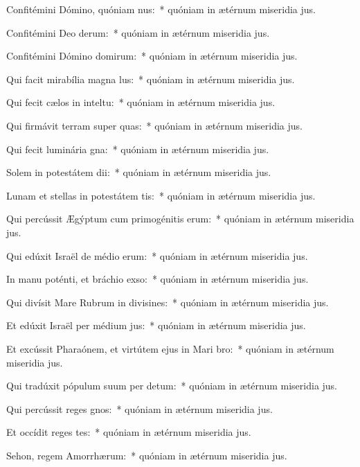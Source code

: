 \item Confitémini Dómino, quóniam nus:~* quóniam in ætérnum miseridia jus.
\item Confitémini Deo derum:~* quóniam in ætérnum miseridia jus.
\item Confitémini Dómino domirum:~* quóniam in ætérnum miseridia jus.
\item Qui facit mirabília magna lus:~* quóniam in ætérnum miseridia jus.
\item Qui fecit cælos in inteltu:~* quóniam in ætérnum miseridia jus.
\item Qui firmávit terram super quas:~* quóniam in ætérnum miseridia jus.
\item Qui fecit luminária gna:~* quóniam in ætérnum miseridia jus.
\item Solem in potestátem dii:~* quóniam in ætérnum miseridia jus.
\item Lunam et stellas in potestátem tis:~* quóniam in ætérnum miseridia jus.
\item Qui percússit Ægýptum cum primogénitis erum:~* quóniam in ætérnum miseridia jus.
\item Qui edúxit Israël de médio erum:~* quóniam in ætérnum miseridia jus.
\item In manu poténti, et bráchio exso:~* quóniam in ætérnum miseridia jus.
\item Qui divísit Mare Rubrum in divisines:~* quóniam in ætérnum miseridia jus.
\item Et edúxit Israël per médium jus:~* quóniam in ætérnum miseridia jus.
\item Et excússit Pharaónem, et virtútem ejus in Mari bro:~* quóniam in ætérnum miseridia jus.
\item Qui tradúxit pópulum suum per detum:~* quóniam in ætérnum miseridia jus.
\item Qui percússit reges gnos:~* quóniam in ætérnum miseridia jus.
\item Et occídit reges tes:~* quóniam in ætérnum miseridia jus.
\item Sehon, regem Amorrhærum:~* quóniam in ætérnum miseridia jus.
